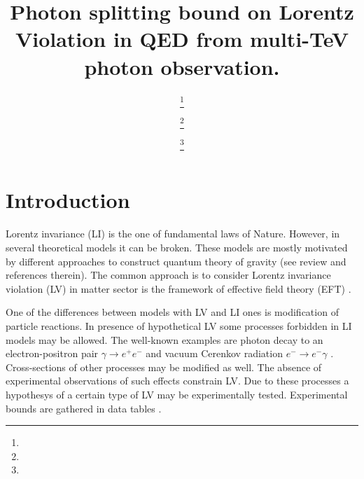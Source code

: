 \documentclass{webofc}
\begin{document}
%
\title{Photon splitting bound on Lorentz Violation in QED from multi-TeV photon observation.}
%
%

\author{ \fnsep\thanks{} \and
         \fnsep\thanks{} \and
         \fnsep\thanks{}
}


%
\maketitle
%


\section{Introduction}
\label{intro}

Lorentz invariance (LI) is the one of fundamental laws of Nature. However, in several theoretical models it can be broken. These models are mostly motivated by different approaches to construct quantum theory of gravity (see review \cite{Liberati:2013xla} and references therein). The common approach is to consider Lorentz invariance violation (LV) in matter sector is the framework of effective field theory (EFT) \cite{Colladay:1998fq}.  

One of the differences between models with LV and LI ones is modification of particle reactions. In presence of hypothetical LV some processes forbidden in LI models may be allowed. The well-known examples are photon decay to an electron-positron pair $\gamma \to e^+e^-$ and vacuum Cerenkov radiation $e^-\to e^-\gamma$ \cite{Coleman:1997xq}. Cross-sections of other processes may be modified as well. The absence of experimental observations of such effects constrain LV. Due to these processes a hypothesys of a certain type of LV may be experimentally tested. Experimental bounds are gathered in data tables \cite{Kostelecky:2008ts}.
\end{document}
